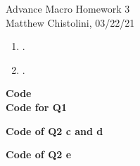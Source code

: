 \documentclass[12pt,oneside,reqno]{amsart}
\begin{document}
\begin{center}
    \Huge{Advance Macro Homework 3}\\
    \large{Matthew Chistolini, 03/22/21}
\end{center}
\vspace{-.3cm}
\begin{enumerate}
\item . \\
    
\item .\\
    
\end{enumerate}
\newpage
{\bf Code}\\
\textbf{Code for Q1}




\textbf{Code of Q2 c and d}


\textbf{Code of Q2 e}



% 
\end{document}
